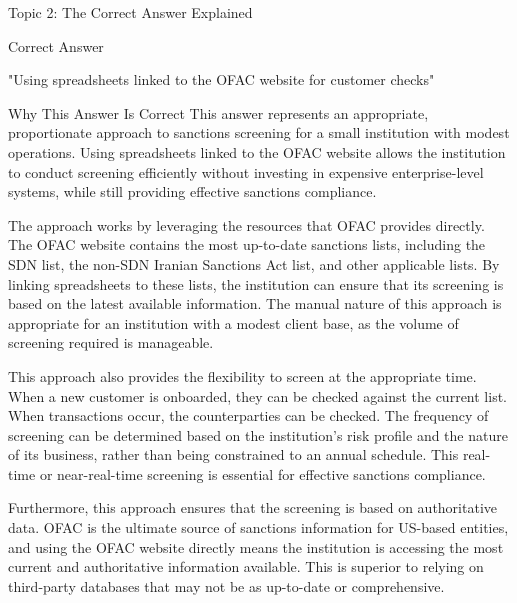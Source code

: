 \documentclass[8pt]{beamer}  %
\newcommand{\correct}{\textcolor{correctgreen}{\ding{51}}}
\begin{document}
	\begin{frame}{Topic 2: The Correct Answer Explained}
		\begin{block}{\large \correct \textcolor{correctgreen}{Correct Answer}}
			\begin{center}
				\Large "Using spreadsheets linked to the OFAC website for customer checks"
			\end{center}
		\end{block}
		
		\vspace{0.2cm}
		\begin{block}{\large Why This Answer Is Correct}
			This answer represents an appropriate, proportionate approach to sanctions screening for a small institution with modest operations. Using spreadsheets linked to the OFAC website allows the institution to conduct screening efficiently without investing in expensive enterprise-level systems, while still providing effective sanctions compliance.
			
			The approach works by leveraging the resources that OFAC provides directly. The OFAC website contains the most up-to-date sanctions lists, including the SDN list, the non-SDN Iranian Sanctions Act list, and other applicable lists. By linking spreadsheets to these lists, the institution can ensure that its screening is based on the latest available information. The manual nature of this approach is appropriate for an institution with a modest client base, as the volume of screening required is manageable.
			
			This approach also provides the flexibility to screen at the appropriate time. When a new customer is onboarded, they can be checked against the current list. When transactions occur, the counterparties can be checked. The frequency of screening can be determined based on the institution's risk profile and the nature of its business, rather than being constrained to an annual schedule. This real-time or near-real-time screening is essential for effective sanctions compliance.
			
			Furthermore, this approach ensures that the screening is based on authoritative data. OFAC is the ultimate source of sanctions information for US-based entities, and using the OFAC website directly means the institution is accessing the most current and authoritative information available. This is superior to relying on third-party databases that may not be as up-to-date or comprehensive.
			

\end{block}
\end{frame}
\end{document}
